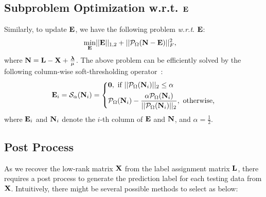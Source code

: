 \documentclass[10pt,twocolumn,letterpaper]{article}
\def\calP{\mathcal{P}}
\def\bN{{\bf N}}
\def\bE{{\bf E}}
\def\blambda{{\bm \lambda}}
\def\calS{{\mathcal{S}}}
\def\bL{{\bf L}}
\def\bX{{\bf X}}
\def\bX{{\bf X}}
\def\zerocolumn{{\bf 0}}
\def\wrt{\emph{w.r.t}}
\begin{document}
\subsection{Subproblem Optimization w.r.t. $\bE$}

Similarly, to update $\bE$, we have the following problem \wrt. $\bE$:
{
\begin{align}
\label{eq:subproblem_wrt_E_2}
  \min_{\bE} & || \bE ||_{1,2} + || \calP_{\Omega} (\bN - \bE) ||_F^2 ,
\end{align}
}
\noindent
where $\bN = \bL - \bX + \frac{\blambda}{\mu}$.
The above problem can be efficiently solved by the following column-wise soft-thresholding operator~\cite{xiao2015FaLRR}:
{
\begin{align}\label{eq:column_wise_soft_thresholding}
  \bE_{i} = \calS_{\alpha}(\bN_{i}) = \left\{
    \begin{aligned}
      & \zerocolumn,~\text{if}~ ||\calP_{\Omega} (\bN_{i})||_2 \leq \alpha   \\
      & \calP_{\Omega} (\bN_{i}) - \frac{\alpha \calP_{\Omega} (\bN_{i})}{|| \calP_{\Omega} (\bN_{i}) ||_2},~\text{otherwise,}
    \end{aligned}
    \right.
\end{align}
}
\noindent
where $\bE_{i}$ and $\bN_{i}$ denote the $i$-th column of $\bE$ and $\bN$,
and $\alpha = \frac{1}{2}$.

\subsection{Post Process}
As we recover the low-rank matrix $\bX$ from the label assignment matrix $\bL$,
there requires a post process to generate the prediction label for each testing data from $\bX$.
Intuitively, there might be several possible methods to select as below:
\end{document}
